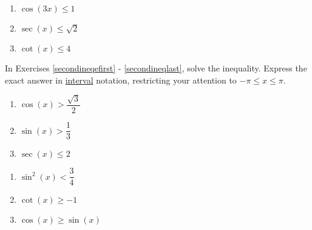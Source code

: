 \begin{multicols}{3}

\begin{enumerate}

\setcounter{enumi}{\value{HW}}

\item $\cos(3x) \leq 1$
\item $\sec(x) \leq \sqrt{2}$
\item $\cot(x) \leq 4$ \label{firstineqlast}

\setcounter{HW}{\value{enumi}}

\end{enumerate}

\end{multicols}

In Exercises \ref{secondineqefirst} - \ref{secondineqlast}, solve the inequality.  Express the exact answer in \underline{interval} notation, restricting your attention to $-\pi \leq x \leq \pi$.

\begin{multicols}{3}

\begin{enumerate}

\setcounter{enumi}{\value{HW}}

\item $\cos \left( x \right) > \dfrac{\sqrt{3}}{2}$ \label{secondineqefirst}
\item  $\sin(x) > \dfrac{1}{3}$ 
\item $\sec \left( x \right) \leq 2$ 

\setcounter{HW}{\value{enumi}}

\end{enumerate}

\end{multicols}

\begin{multicols}{3}

\begin{enumerate}

\setcounter{enumi}{\value{HW}}

\item $\sin^{2} \left( x \right) < \dfrac{3}{4}$
\item $\cot \left( x \right) \geq -1$ 
\item $\cos(x) \geq \sin(x)$  \label{secondineqlast}

\setcounter{HW}{\value{enumi}}

\end{enumerate}

\end{multicols}

